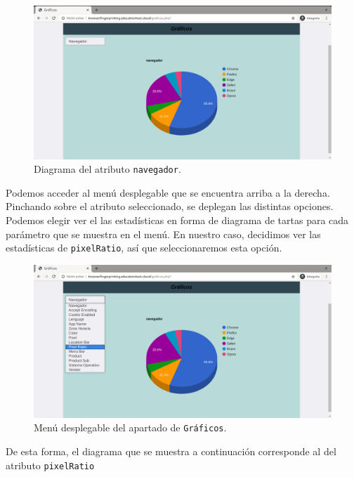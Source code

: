 \begin{figure}[H]
	\centering
	\includegraphics[width=1\textwidth]{Images/navegadorChart.png}
	\caption{Diagrama del atributo \texttt{navegador}.}
	\label{fig:navegadorChart}
\end{figure}

Podemos acceder al menú desplegable que se encuentra arriba a la derecha. Pinchando sobre el atributo seleccionado, se deplegan las distintas opciones. Podemos elegir ver el las estadísticas en forma de diagrama de tartas para cada parámetro que se muestra en el menú. En nuestro caso, decidimos ver las estadísticas de \texttt{pixelRatio}, así que seleccionaremos esta opción.

\begin{figure}[H]
	\centering
	\includegraphics[width=1\textwidth]{Images/menuChart.png}
	\caption{Menú desplegable del apartado de \texttt{Gráficos}.}
	\label{fig:menuChart}
\end{figure}

De esta forma, el diagrama que se muestra a continuación corresponde al del atributo \texttt{pixelRatio}

